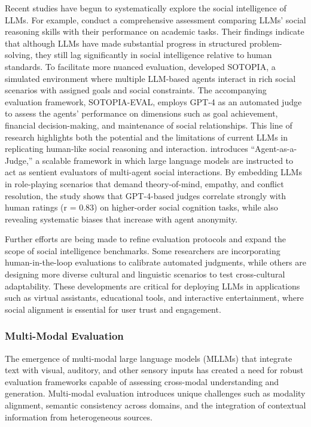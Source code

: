 Recent studies have begun to systematically explore the social intelligence of LLMs. For example, \citet{xu2024academically} conduct a comprehensive assessment comparing LLMs' social reasoning skills with their performance on academic tasks. Their findings indicate that although LLMs have made substantial progress in structured problem-solving, they still lag significantly in social intelligence relative to human standards. To facilitate more nuanced evaluation, \citet{zhou2023sotopia} developed SOTOPIA, a simulated environment where multiple LLM-based agents interact in rich social scenarios with assigned goals and social constraints. The accompanying evaluation framework, SOTOPIA-EVAL, employs GPT-4 as an automated judge to assess the agents’ performance on dimensions such as goal achievement, financial decision-making, and maintenance of social relationships. This line of research highlights both the potential and the limitations of current LLMs in replicating human-like social reasoning and interaction. \citet{zhang2025sentient} introduces “Agent-as-a-Judge,” a scalable framework in which large language models are instructed to act as sentient evaluators of multi-agent social interactions. By embedding LLMs in role-playing scenarios that demand theory-of-mind, empathy, and conflict resolution, the study shows that GPT-4-based judges correlate strongly with human ratings (r = 0.83) on higher-order social cognition tasks, while also revealing systematic biases that increase with agent anonymity.

Further efforts are being made to refine evaluation protocols and expand the scope of social intelligence benchmarks. Some researchers are incorporating human-in-the-loop evaluations to calibrate automated judgments, while others are designing more diverse cultural and linguistic scenarios to test cross-cultural adaptability. These developments are critical for deploying LLMs in applications such as virtual assistants, educational tools, and interactive entertainment, where social alignment is essential for user trust and engagement.

\subsubsection{\textbf{Multi-Modal Evaluation}}
The emergence of multi-modal large language models (MLLMs) that integrate text with visual, auditory, and other sensory inputs has created a need for robust evaluation frameworks capable of assessing cross-modal understanding and generation. Multi-modal evaluation introduces unique challenges such as modality alignment, semantic consistency across domains, and the integration of contextual information from heterogeneous sources.

